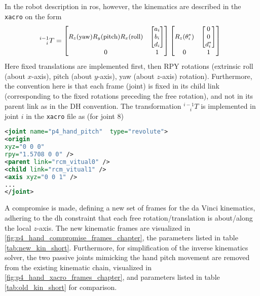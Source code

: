 In the robot description in \gls{ros}, however, the kinematics are described in the \texttt{xacro} on the form
\begin{equation}
\hspace*{-2mm}
\small
^{i-1}_{\phantom{-1}i}T =
\begin{bmatrix}
R_z(\text{yaw})R_y(\text{pitch})R_x(\text{roll}) & \begin{bmatrix}a_i\\ b_i\\ d_i\end{bmatrix}\\
0 & 1
\end{bmatrix}
\begin{bmatrix}
R_z(\theta_i^*) & \begin{bmatrix}0\\ 0\\ d_i^* \end{bmatrix}\\
0 & 1
\end{bmatrix}
\label{eq:xacro_transformation_chapter}
\end{equation}
Here fixed translations are implemented first, then RPY rotations (extrinsic roll (about $x$-axis), pitch (about $y$-axis), yaw (about $z$-axis) rotation). Furthermore, the convention here is that each frame (joint) is fixed in its child link (corresponding to the fixed rotations preceding the free rotation), and not in its parent link as in the DH convention. The transformation  $^{i-1}_{\phantom{-1}i} T$ is implemented in joint $i$ in the \texttt{xacro} file  as (for joint 8)
\begin{lstlisting}[language=xml]
<joint name="p4_hand_pitch"  type="revolute">
<origin
xyz="0 0 0"
rpy="1.5708 0 0" />
<parent link="rcm_vitual0" />
<child link="rcm_vitual1" />
<axis xyz="0 0 1" />
...
</joint>
\end{lstlisting}

A compromise is made, defining a new set of frames for the da Vinci kinematics, adhering to the \gls{dh} constraint that each free rotation/translation is about/along the local $z$-axis. The new kinematic frames are visualized in \autoref{fig:p4_hand_compromise_frames_chapter}, the parameters listed in table \ref{tab:new_kin_short}. Furthermore, for simplification of the inverse kinematics solver, the two passive joints mimicking the hand pitch movement are removed from the existing kinematic chain, visualized in \autoref{fig:p4_hand_xacro_frames_chapter}, and parameters listed in table \ref{tab:old_kin_short} for comparison.  



